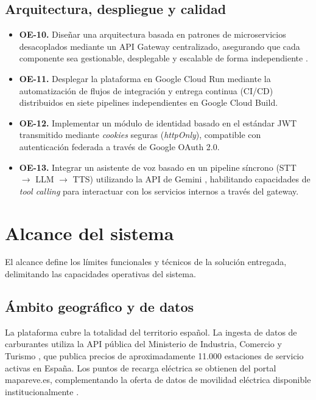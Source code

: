 \subsection{Arquitectura, despliegue y calidad}

\begin{itemize}
      \item \textbf{OE-10.} Diseñar una arquitectura basada en patrones de microservicios desacoplados mediante un API Gateway centralizado, asegurando que cada componente sea gestionable, desplegable y escalable de forma independiente \cite{Gartner2026Trends}.

      \item \textbf{OE-11.} Desplegar la plataforma en Google Cloud Run mediante
            la automatización de flujos de integración y entrega continua (CI/CD)
            distribuidos en siete pipelines independientes en Google Cloud Build.

      \item \textbf{OE-12.} Implementar un módulo de identidad basado en el estándar
            JWT transmitido mediante \textit{cookies} seguras (\textit{httpOnly}), compatible
            con autenticación federada a través de Google OAuth 2.0.

      \item \textbf{OE-13.} Integrar un asistente de voz basado en un pipeline síncrono
            (STT $\rightarrow$ LLM $\rightarrow$ TTS) utilizando la API de Gemini \cite{gemini_2_5},
            habilitando capacidades de \textit{tool calling} \cite{genai_tool_calling} para interactuar
            con los servicios internos a través del gateway.
\end{itemize}

\section{Alcance del sistema}
\label{sec:alcance}

El alcance define los límites funcionales y técnicos de la solución entregada, delimitando las capacidades operativas del sistema.

\subsection{Ámbito geográfico y de datos}
La plataforma cubre la totalidad del territorio español.
La ingesta de datos de carburantes utiliza la API pública del Ministerio de Industria, Comercio y Turismo
\cite{datosgob_carburantes}, que publica precios de aproximadamente 11.000 estaciones de servicio activas
en España. Los puntos de recarga eléctrica se obtienen del portal
mapareve.es, complementando la oferta de datos de movilidad eléctrica
disponible institucionalmente \cite{reve_mapa}.

